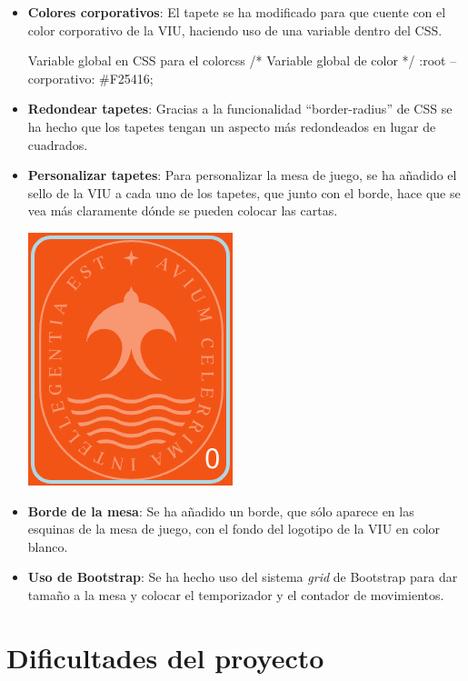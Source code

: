\documentclass{\ClassPath/viu-tfm-template}
\begin{document}
\vspace{-1em}
\begin{itemize}
    \item \textbf{Colores corporativos}: El tapete se ha modificado para que cuente con el color corporativo de la VIU, haciendo uso de una variable dentro del CSS.
    \begin{mycode}{Variable global en CSS para el color}{css}{}
/* Variable global de color */
:root {
    --corporativo: #F25416;
}
\end{mycode}

    \item \textbf{Redondear tapetes}: Gracias a la funcionalidad “border-radius” de CSS se ha hecho que los tapetes tengan un aspecto más redondeados en lugar de cuadrados.

    \item \textbf{Personalizar tapetes}: Para personalizar la mesa de juego, se ha añadido el sello de la VIU a cada uno de los tapetes, que junto con el borde, hace que se vea más claramente dónde se pueden colocar las cartas.

    \vspace{-0.6em}
    \begin{center}
        \includegraphics[frame,width=0.26\linewidth]{img/tapete.png}
    \end{center}
    \vspace{-2em}

    \item \textbf{Borde de la mesa}: Se ha añadido un borde, que sólo aparece en las esquinas de la mesa de juego, con el fondo del logotipo de la VIU en color blanco.

    \item \textbf{Uso de Bootstrap}: Se ha hecho uso del sistema \textit{grid} de Bootstrap para dar tamaño a la mesa y colocar el temporizador y el contador de movimientos.
\end{itemize}
\vspace{-1em}


\chapter{Dificultades del proyecto}
\end{document}
